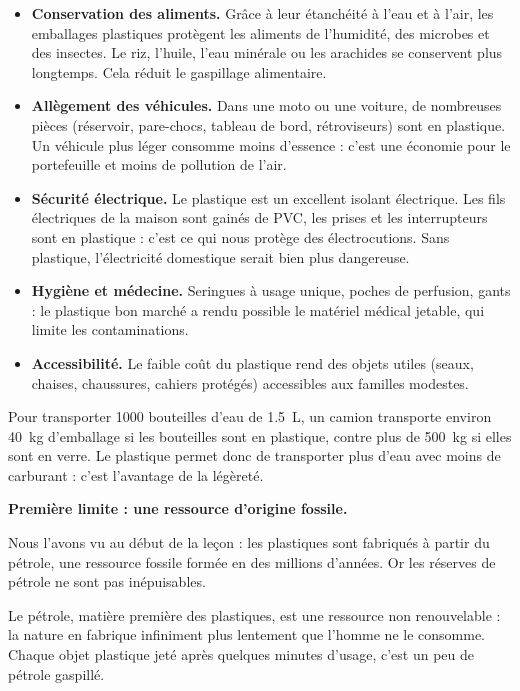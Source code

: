 \documentclass[11pt]{article}
\newcommand{\cle}[1]{{\popxbold\color{popdark}#1}}
\newcounter{popsec}
\newcounter{popsub}
\newcommand{\courssub}[1]{%
  \stepcounter{popsub}%
  \par\vspace{9pt}\noindent{\popxbold\fontsize{11.5}{13}\selectfont\color{popink}{\color{poporange}\thepopsec.\thepopsub}\hspace{6pt}#1}\par\nopagebreak\vspace{4pt}
}
\begin{document}
\begin{itemize}
\item \textbf{Conservation des aliments.} Grâce à leur étanchéité à l'eau et à l'air, les emballages plastiques protègent les aliments de l'humidité, des microbes et des insectes. Le riz, l'huile, l'eau minérale ou les arachides se conservent plus longtemps. Cela réduit le gaspillage alimentaire.
\item \textbf{Allègement des véhicules.} Dans une moto ou une voiture, de nombreuses pièces (réservoir, pare-chocs, tableau de bord, rétroviseurs) sont en plastique. Un véhicule plus léger consomme moins d'essence : c'est une économie pour le portefeuille et moins de pollution de l'air.
\item \textbf{Sécurité électrique.} Le plastique est un excellent isolant électrique. Les fils électriques de la maison sont gainés de PVC, les prises et les interrupteurs sont en plastique : c'est ce qui nous protège des électrocutions. Sans plastique, l'électricité domestique serait bien plus dangereuse.
\item \textbf{Hygiène et médecine.} Seringues à usage unique, poches de perfusion, gants : le plastique bon marché a rendu possible le matériel médical jetable, qui limite les contaminations.
\item \textbf{Accessibilité.} Le faible coût du plastique rend des objets utiles (seaux, chaises, chaussures, cahiers protégés) accessibles aux familles modestes.
\end{itemize}

\begin{exemplebox}
Pour transporter 1000 bouteilles d'eau de \SI{1,5}{L}, un camion transporte environ \SI{40}{kg} d'emballage si les bouteilles sont en plastique, contre plus de \SI{500}{kg} si elles sont en verre. Le plastique permet donc de transporter plus d'eau avec moins de carburant : c'est l'avantage de la légèreté.
\end{exemplebox}

\courssub{Les limites des matières plastiques}

\textbf{Première limite : une ressource d'origine fossile.}

Nous l'avons vu au début de la leçon : les plastiques sont fabriqués à partir du \cle{pétrole}, une ressource fossile formée en des millions d'années. Or les réserves de pétrole ne sont pas inépuisables.

\begin{aretenir}
Le pétrole, matière première des plastiques, est une ressource \cle{non renouvelable} : la nature en fabrique infiniment plus lentement que l'homme ne le consomme. Chaque objet plastique jeté après quelques minutes d'usage, c'est un peu de pétrole gaspillé.
\end{aretenir}
\end{document}
